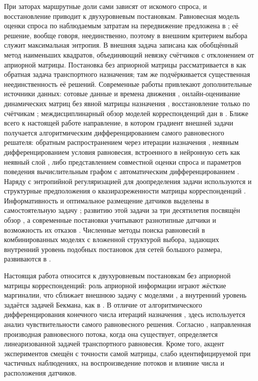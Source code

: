 \documentclass{crm-article}
\begin{document}
При заторах маршрутные доли сами зависят от искомого спроса, и восстановление
приводит к двухуровневым постановкам. Равновесная модель оценки спроса по
наблюдаемым затратам на передвижение предложена в \cite{Nguyen1977}; её
решение, вообще говоря, неединственно, поэтому в
\cite{JornstenNguyen1979,Fisk1988} внешним критерием выбора служит
максимальная энтропия. В \cite{Yang1992} внешняя задача записана как
обобщённый метод наименьших квадратов, объединяющий невязку счётчиков с
отклонением от априорной матрицы. Постановка без априорной матрицы
рассматривается в \cite{Krylatov2021} как обратная задача транспортного
назначения; там же подчёркивается существенная неединственность её решений.
Современные работы привлекают дополнительные источники данных: сотовые данные
и времена движения \cite{Mohanty2020}, онлайн-оценивание динамических матриц
без явной матрицы назначения \cite{Castiglione2021}, восстановление только по
счётчикам \cite{Dey2020}; междисциплинарный обзор моделей корреспонденций дан
в \cite{Rong2024}. Ближе всего к настоящей работе направление, в котором
градиент внешней задачи получается алгоритмическим дифференцированием самого
равновесного решателя: обратным распространением через итерации назначения
\cite{Patwary2023}, неявным дифференцированием условия равновесия,
встроенного в нейронную сеть как неявный слой \cite{LiuYin2023}, либо
представлением совместной оценки спроса и параметров поведения вычислительным
графом с автоматическим дифференцированием \cite{Guarda2024}. Наряду с
энтропийной регуляризацией для доопределения задачи используются и
структурные предположения о квазиразреженности матрицы корреспонденций
\cite{WangBan2023}. Информативность и оптимальное размещение датчиков
выделены в самостоятельную задачу \cite{ZhouList2010}; развитию этой задачи
за три десятилетия посвящён обзор \cite{Owais2022}, а современные постановки
учитывают разнотипные датчики и возможность их отказов \cite{Sun2025}.
Численные методы поиска равновесий в комбинированных моделях с вложенной
структурой выбора, задающих внутренний уровень подобных постановок для сетей
большого размера, развиваются в \cite{Kubentayeva2024}.

Настоящая работа относится к двухуровневым постановкам без априорной
матрицы корреспонденций: роль априорной информации играют жёсткие маргиналии, что сближает внешнюю задачу с моделями
\cite{Wilson1968,Fisk1988}, а внутренний уровень задаётся задачей Бекмана, как
в \cite{Yang1992,Krylatov2021}. В отличие от алгоритмического
дифференцирования конечного числа итераций назначения
\cite{Patwary2023}, здесь используется анализ чувствительности самого
равновесного решения. Согласно \cite{JosefssonPatriksson2007}, направленная
производная равновесного потока, когда она существует, определяется
линеаризованной задачей транспортного равновесия. Кроме того, акцент
экспериментов смещён с точности самой матрицы, слабо идентифицируемой при
частичных наблюдениях, на воспроизведение потоков и влияние числа и
расположения датчиков.
\end{document}
